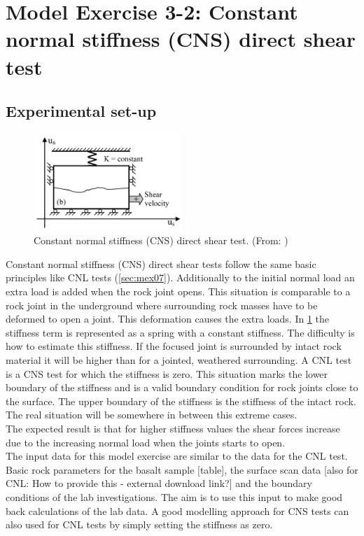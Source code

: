 \section{Model Exercise 3-2: Constant normal stiffness (CNS) direct shear test}
\label{sec:mex08}
\subsection{Experimental set-up}
\begin{figure}[!ht]
\begin{center}
\includegraphics[width=0.5\textwidth]{./figures/MEX8_CNS_Nguyen_Thesis.PNG}
\end{center}
\caption{Constant normal stiffness (CNS) direct shear test. (From: \cite{Nguyen2014})}
\label{fig:MEX8_CNS}
\end{figure}

Constant normal stiffness (CNS) direct shear tests follow the same basic principles like CNL tests (\ref{sec:mex07}). Additionally to the initial normal load an extra load is added when the rock joint opens. This situation is comparable to a rock joint in the underground where surrounding rock masses have to be deformed to open a joint. This deformation causes the extra loads. In \ref{fig:MEX8_CNS} the stiffness term is represented as a spring with a constant stiffness. The difficulty is how to estimate this stiffness. If the focused joint is surrounded by intact rock material it will be higher than for a jointed, weathered surrounding. A CNL test is a CNS test for which the stiffness is zero. This situation marks the lower boundary of the stiffness and is a valid boundary condition for rock joints close to the surface. The upper boundary of the stiffness is the stiffness of the intact rock. The real situation will be somewhere in between this extreme cases.\\
The expected result is that for higher stiffness values the shear forces increase due to the increasing normal load when the joints starts to open.\\
The input data for this model exercise are similar to the data for the CNL test. Basic rock parameters for the basalt sample [table], the surface scan data [also for CNL: How to provide this - external download link?] and the boundary conditions of the lab investigations. The aim is to use this input to make good back calculations of the lab data. A good modelling approach for CNS tests can also used for CNL tests by simply setting the stiffness as zero.


